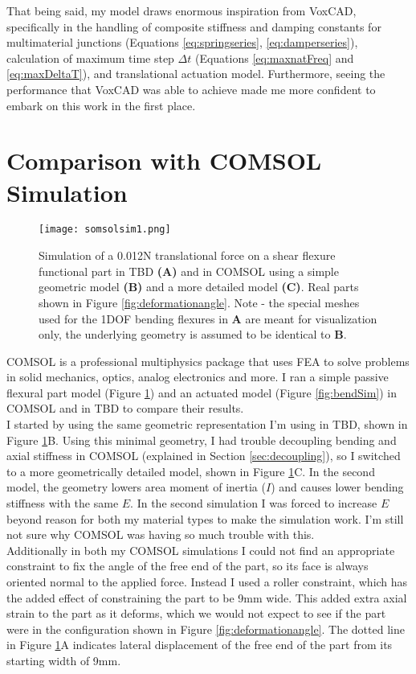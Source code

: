 {That being said, my model draws enormous inspiration from VoxCAD, specifically in the handling of composite stiffness and damping constants for multimaterial junctions (Equations \ref{eq:springseries}, \ref{eq:damperseries}), calculation of maximum time step $\Delta t$ (Equations \ref{eq:maxnatFreq} and \ref{eq:maxDeltaT}), and translational actuation model.  Furthermore, seeing the performance that VoxCAD was able to achieve made me more confident to embark on this work in the first place. 

\section{Comparison with COMSOL Simulation}

\begin{figure}
  \texttt{[image: somsolsim1.png]}
  \caption{Simulation of a 0.012N translational force on a shear flexure functional part in TBD \textbf{(A)} and in COMSOL using a simple geometric model \textbf{(B)} and a more detailed model \textbf{(C)}.  Real parts shown in Figure \ref{fig:deformationangle}.  Note - the special meshes used for the 1DOF bending flexures in \textbf{A} are meant for visualization only, the underlying geometry is assumed to be identical to \textbf{B}.}
  \label{fig:somsolsim1}
\end{figure}


COMSOL is a professional multiphysics package that uses FEA to solve problems in solid mechanics, optics, analog electronics and more.  I ran a simple passive flexural part model (Figure \ref{fig:somsolsim1}) and an actuated model (Figure \ref{fig:bendSim}) in COMSOL and in TBD to compare their results.\\

I started by using the same geometric representation I'm using in TBD, shown in Figure \ref{fig:somsolsim1}B. Using this minimal geometry, I had trouble decoupling bending and axial stiffness in COMSOL (explained in Section \ref{sec:decoupling}), so I switched to a more geometrically detailed model, shown in Figure \ref{fig:somsolsim1}C.  In the second model, the geometry lowers area moment of inertia ($I$) and causes lower bending stiffness with the same $E$.  In the second simulation I was forced to increase $E$ beyond reason for both my material types to make the simulation work.  I'm still not sure why COMSOL was having so much trouble with this.\\

Additionally in both my COMSOL simulations I could not find an appropriate constraint to fix the angle of the free end of the part, so its face is always oriented normal to the applied force.  Instead I used a roller constraint, which has the added effect of constraining the part to be 9mm wide.  This added extra axial strain to the part as it deforms, which we would not expect to see if the part were in the configuration shown in Figure \ref{fig:deformationangle}.  The dotted line in Figure \ref{fig:somsolsim1}A indicates lateral displacement of the free end of the part from its starting width of 9mm.

}
